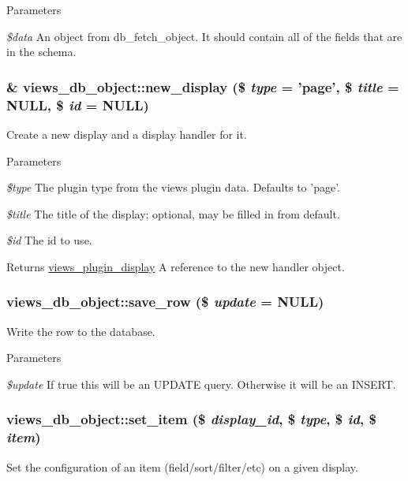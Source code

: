 \begin{DoxyParams}{Parameters}
\item[{\em \$data}]An object from db\_\-fetch\_\-object. It should contain all of the fields that are in the schema. \end{DoxyParams}
\hypertarget{classviews__db__object_ab7a8ea5c81d0c335d8e0fb87443349a3}{
\subsubsection[{new\_\-display}]{\setlength{\rightskip}{0pt plus 5cm}\& views\_\-db\_\-object::new\_\-display (\$ {\em type} = {\ttfamily 'page'}, \/  \$ {\em title} = {\ttfamily NULL}, \/  \$ {\em id} = {\ttfamily NULL})}}
\label{classviews__db__object_ab7a8ea5c81d0c335d8e0fb87443349a3}
Create a new display and a display handler for it. 
\begin{DoxyParams}{Parameters}
\item[{\em \$type}]The plugin type from the views plugin data. Defaults to 'page'. \item[{\em \$title}]The title of the display; optional, may be filled in from default. \item[{\em \$id}]The id to use. \end{DoxyParams}
\begin{DoxyReturn}{Returns}
\hyperlink{classviews__plugin__display}{views\_\-plugin\_\-display} A reference to the new handler object. 
\end{DoxyReturn}
\hypertarget{classviews__db__object_a5e126880af73008d7ce245c24cfaebab}{
\subsubsection[{save\_\-row}]{\setlength{\rightskip}{0pt plus 5cm}views\_\-db\_\-object::save\_\-row (\$ {\em update} = {\ttfamily NULL})}}
\label{classviews__db__object_a5e126880af73008d7ce245c24cfaebab}
Write the row to the database.


\begin{DoxyParams}{Parameters}
\item[{\em \$update}]If true this will be an UPDATE query. Otherwise it will be an INSERT. \end{DoxyParams}
\hypertarget{classviews__db__object_a4ac5fda69733790427be9edd7c717568}{
\subsubsection[{set\_\-item}]{\setlength{\rightskip}{0pt plus 5cm}views\_\-db\_\-object::set\_\-item (\$ {\em display\_\-id}, \/  \$ {\em type}, \/  \$ {\em id}, \/  \$ {\em item})}}
\label{classviews__db__object_a4ac5fda69733790427be9edd7c717568}
Set the configuration of an item (field/sort/filter/etc) on a given display.

